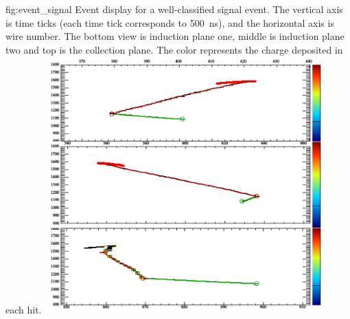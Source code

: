\begin{dunefigure}
{fig:event_signal}
{Event display for a well-classified \ptoknubar signal event.  The vertical axis is time ticks (each time tick corresponds to \SI{500}{\ns}), and the horizontal axis is wire number. The bottom view is induction plane one, middle is induction plane two and top is the collection plane. The color represents the charge deposited in each hit.}
\includegraphics[width=0.8\textwidth]{graphics/event_signal.png}
\end{dunefigure} 

